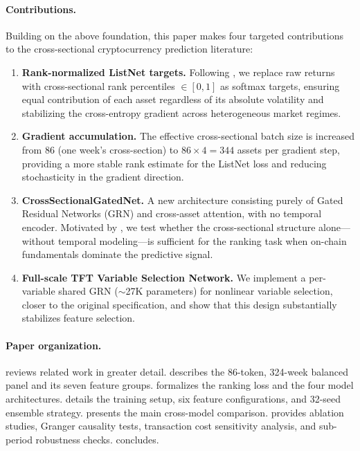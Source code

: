\paragraph{Contributions.}
Building on the above foundation, this paper makes four targeted contributions
to the cross-sectional cryptocurrency prediction literature:
\begin{enumerate}
  \item \textbf{Rank-normalized ListNet targets.}
        Following \citet{poh2021building}, we replace raw returns with
        cross-sectional rank percentiles $\in [0,1]$ as softmax targets,
        ensuring equal contribution of each asset regardless of its
        absolute volatility and stabilizing the cross-entropy gradient
        across heterogeneous market regimes.
  \item \textbf{Gradient accumulation.}
        The effective cross-sectional batch size is increased from 86
        (one week's cross-section) to $86 \times 4 = 344$ assets per
        gradient step, providing a more stable rank estimate for the
        ListNet loss and reducing stochasticity in the gradient direction.
  \item \textbf{CrossSectionalGatedNet.}
        A new architecture consisting purely of Gated Residual Networks
        (GRN) and cross-asset attention, with no temporal encoder.
        Motivated by \citet{gu2020empirical}, we test whether the
        cross-sectional structure alone—without temporal modeling—is
        sufficient for the ranking task when on-chain fundamentals
        dominate the predictive signal.
  \item \textbf{Full-scale TFT Variable Selection Network.}
        We implement a per-variable shared GRN ($\sim$27K parameters) for
        nonlinear variable selection, closer to the original
        \citet{lim2021temporal} specification, and show that this design
        substantially stabilizes feature selection.
\end{enumerate}

\paragraph{Paper organization.}
 reviews related work in greater detail.
 describes the 86-token, 324-week balanced panel and its
seven feature groups.
 formalizes the ranking loss and the four model architectures.
 details the training setup, six feature configurations,
and 32-seed ensemble strategy.
 presents the main cross-model comparison.
 provides ablation studies, Granger causality tests,
transaction cost sensitivity analysis, and sub-period robustness checks.
 concludes.
